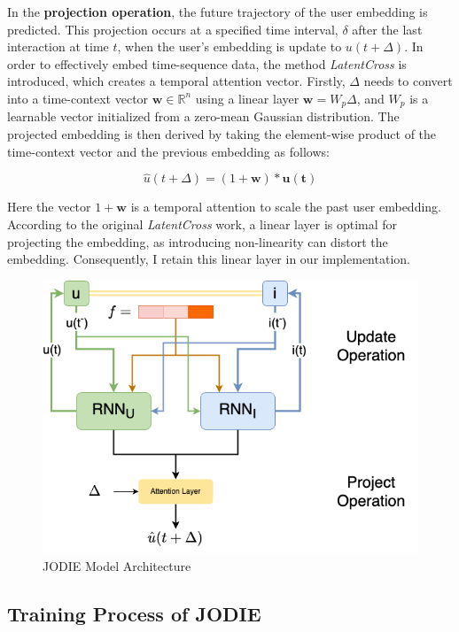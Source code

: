 In the \textbf{projection operation}, the future trajectory of the user embedding is predicted. This projection occurs at a specified time interval, $\delta$ after the last interaction at time $t$, when the user's embedding is update to $u(t+\Delta)$. 
In order to effectively embed time-sequence data, the method \textit{LatentCross}\cite{10.1145/3159652.3159727} is introduced, which creates a temporal attention vector. Firstly, $\Delta$ needs to convert into a time-context vector $\mathbf{w} \in \mathbb{R} ^n$ using a linear layer $\mathbf{w} =W_p \Delta$, and $W_p$ is a learnable vector initialized from a zero-mean Gaussian distribution. The projected embedding is then derived by taking the element-wise product of the time-context vector and the previous embedding as follows:

\[ \hat{u}(t+ \Delta) = (1+\mathbf{w})*\mathbf{u(t)} \]

Here the vector $1+\mathbf{w}$ is a temporal attention to scale the past user embedding. According to the original \textit{LatentCross} work, a linear layer is optimal for projecting the embedding, as introducing non-linearity can distort the embedding. Consequently, I retain this linear layer in our implementation.

\begin{figure}[h]
    \centering
    \includegraphics[width=\linewidth]{figures/04_JODIE.png}
    \caption{JODIE Model Architecture}
    \label{fig:JODIE}
\end{figure}



\subsection{Training Process of JODIE}


